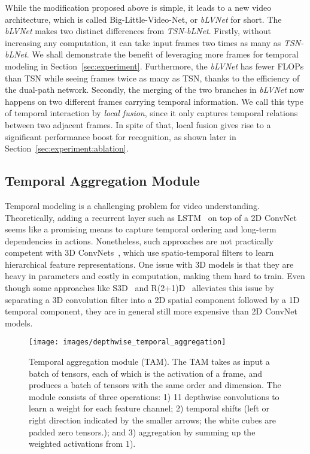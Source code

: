 \documentclass{article}
\def\blvnet{\textit{TSN-bLNet}\xspace}
\def\blvnetnew{\textit{bLVNet}\xspace}
\begin{document}
While the modification proposed above is simple, it leads to a new video architecture, which is called Big-Little-Video-Net, or \blvnetnew for short.
The \blvnetnew makes two distinct differences from \blvnet.
Firstly, without increasing any computation, it can take input frames two times as many as \blvnet. We shall demonstrate the benefit of leveraging more frames for temporal modeling in Section~\ref{sec:experiment}.
Furthermore, the \blvnetnew has  fewer FLOPs than TSN while seeing frames twice as many as TSN, thanks to the efficiency of the dual-path network. Secondly, the merging of the two branches in \blvnetnew now happens on two different frames carrying temporal information.
We call this type of temporal interaction by \textit{local fusion}, since it only captures temporal relations between two adjacent frames.
In spite of that, local fusion gives rise to a significant performance boost for recognition, as shown later in Section~\ref{sec:experiment:ablation}.

\subsection{Temporal Aggregation Module}
\label{sec:approach:deta}
Temporal modeling is a challenging problem for video understanding. Theoretically, adding a recurrent layer such as LSTM~\cite{lstm:donahue2015longterm} on top of a 2D ConvNet  seems like a promising means to capture temporal ordering and long-term dependencies in actions. Nonetheless, such approaches are not practically competent with 3D ConvNets~\cite{I3D:carreira2017quo}, which use spatio-temporal filters to learn hierarchical feature representations.
One issue with 3D models is that they are heavy in parameters and costly in computation, making them hard to train. 
Even though some approaches like S3D~\cite{S3D:xie2018rethinking} and R(2+1)D~\cite{R(2+1)D:tran2018closer} alleviates this issue by separating a 3D convolution filter into a 2D spatial component followed by a 1D temporal component, they are in general still more expensive than 2D ConvNet models. 

\begin{figure}[b!] 
\centering
\texttt{[image: images/depthwise\_temporal\_aggregation]}
\caption{\label{fig:fusion} Temporal aggregation module (TAM). The TAM takes as input a batch of tensors, each of which is the activation of a frame, and produces a batch of tensors with the same order and dimension. The module consists of three operations: 1) 11 depthwise convolutions to learn a weight for each feature channel; 2) temporal shifts (left or right direction indicated by the smaller arrows; the white cubes are padded zero tensors.); and 3) aggregation by summing up the weighted activations from 1). } 

\end{figure}  
\end{document}
